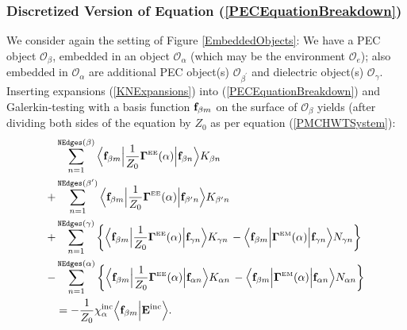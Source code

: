 \subsubsection*{Discretized Version of Equation 
                (\ref{PECEquationBreakdown})}

We consider again the setting of Figure \ref{EmbeddedObjects}:
We have a PEC object $\mathcal{O}_\beta$, embedded in an object
$\mathcal{O}_\alpha$ (which may be the environment 
$\mathcal{O}_e$); also embedded in $\mathcal{O}_\alpha$ are
additional PEC object(s) $\mathcal{O}_{\beta^\prime}$ and dielectric 
object(s) $\mathcal{O}_\gamma.$ 
Inserting expansions (\ref{KNExpansions}) 
into (\ref{PECEquationBreakdown})
and Galerkin-testing with a basis function $\mathbf{f}_{\beta m}$ on 
the surface of $\mathcal{O}_\beta$ yields 
(after dividing both 
sides of the equation by $Z_0$ as per equation (\ref{PMCHWTSystem}):
\begin{align}
&\sum_{n=1}^{\texttt{NEdges}(\beta)} 
   \Big\langle 
         \mathbf{f}_{\beta m} 
   \Big| \frac{1}{Z_0} \boldsymbol{\Gamma}^{\hbox{\tiny{EE}}}(\alpha) \Big|
         \mathbf{f}_{\beta n}
   \Big\rangle 
         K_{\beta n}
\nonumber \\
+&\sum_{n=1}^{\texttt{NEdges}(\beta^\prime)} 
   \Big\langle 
         \mathbf{f}_{\beta m} 
   \Big| \frac{1}{Z_0} \boldsymbol{\Gamma}^{\hbox{\tiny{EE}}}(\alpha) \Big| 
         \mathbf{f}_{\beta^\prime n}
   \Big\rangle 
         K_{\beta^\prime n}
\nonumber \\
+&\sum_{n=1}^{\texttt{NEdges}(\gamma)} \bigg\{
   \Big\langle 
         \mathbf{f}_{\beta m} 
   \Big| \frac{1}{Z_0} \boldsymbol{\Gamma}^{\hbox{\tiny{EE}}}(\alpha) \Big| 
         \mathbf{f}_{\gamma n}
   \Big\rangle 
         K_{\gamma n}
   \,-
   \Big\langle 
         \mathbf{f}_{\beta m} 
   \Big| \boldsymbol{\Gamma}^{\hbox{\tiny{EM}}}(\alpha) \Big| 
         \mathbf{f}_{\gamma n}
   \Big\rangle 
         N_{\gamma n}
  \bigg\}
\nonumber \\
-&\sum_{n=1}^{\texttt{NEdges}(\alpha)} \bigg\{
   \Big\langle 
         \mathbf{f}_{\beta m} 
   \Big| \frac{1}{Z_0} \boldsymbol{\Gamma}^{\hbox{\tiny{EE}}}(\alpha) \Big| 
         \mathbf{f}_{\alpha n}
   \Big\rangle 
         K_{\alpha n}
   \,-
   \Big\langle 
         \mathbf{f}_{\beta m} 
   \Big| \boldsymbol{\Gamma}^{\hbox{\tiny{EM}}}(\alpha) \Big| 
         \mathbf{f}_{\alpha n}
   \Big\rangle 
         N_{\alpha n}
  \bigg\}
\nonumber \\
&=-\frac{1}{Z_0} \chi_\alpha^{\hbox{\scriptsize{inc}}} 
   \Big\langle \mathbf{f}_{\beta m} \Big| \mathbf{E}^{\hbox{\scriptsize{inc}}} \Big\rangle.
 \label{DiscretizedPECEquation}
\end{align}

